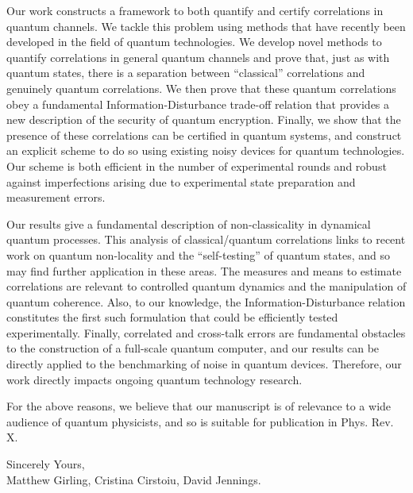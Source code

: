 \documentclass[11pt]{letter}
\begin{document}
Our work constructs a framework to both quantify and certify correlations in quantum channels. We tackle this problem using methods that have recently been developed in the field of quantum technologies. We develop novel methods to quantify correlations in general quantum channels and prove that, just as with quantum states, there is a separation between ``classical'' correlations and genuinely quantum correlations. We then prove that these quantum correlations obey a fundamental Information-Disturbance trade-off relation that provides a new description of the security of quantum encryption. Finally, we show that the presence of these correlations can be certified in quantum systems, and construct an explicit scheme to do so using existing noisy devices for quantum technologies. Our scheme is both efficient in the number of experimental rounds and robust against imperfections arising due to experimental state preparation and measurement errors.

Our results give a fundamental description of non-classicality in dynamical quantum processes.  This analysis of classical/quantum correlations links to recent work on quantum non-locality and the ``self-testing'' of quantum states, and so may find further application in these areas. The measures and means to estimate correlations are relevant to controlled quantum dynamics and the manipulation of quantum coherence.  Also, to our knowledge, the Information-Disturbance relation constitutes the first such formulation that could be efficiently tested experimentally.  Finally, correlated and cross-talk errors are fundamental obstacles to the construction of a full-scale quantum computer, and our results can be directly applied to the benchmarking of noise in quantum devices. Therefore, our work directly impacts ongoing quantum technology research.

For the above reasons, we believe that our manuscript is of relevance to a wide audience of quantum physicists, and so is suitable for publication in Phys. Rev. X.

\vspace{1cm}
\hspace{8cm}
\begin{minipage}{9cm}
\flushleft
Sincerely Yours,\\

Matthew Girling, Cristina Cirstoiu, David Jennings.
\end{minipage}
\newpage
\end{document}
